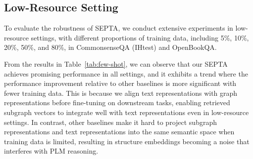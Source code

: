 \documentclass[runningheads]{llncs}
\begin{document}
\subsection{Low-Resource Setting}
To evaluate the robustness of SEPTA, we conduct extensive experiments in low-resource settings, with different proportions of training data, including 5\%, 10\%, 20\%, 50\%, and 80\%, in CommonsenseQA (IHtest) and OpenBookQA. 

From the results in Table~\ref{tab:few-shot}, we can observe that our SEPTA achieves promising performance in all settings, and it exhibits a trend where the performance improvement relative to other baselines is more significant with fewer training data. This is because we align text representations with graph representations before fine-tuning on downstream tasks, enabling retrieved subgraph vectors to integrate well with text representations even in low-resource settings. In contrast, other baselines make it hard to project subgraph representations and text representations into the same semantic space when training data is limited, resulting in structure embeddings becoming a noise that interferes with PLM reasoning.
\end{document}

